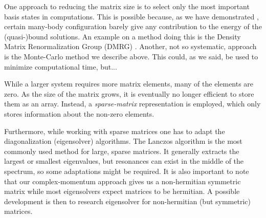 \documentclass[../main/report.tex]{subfiles}
\begin{document}
One approach to reducing the matrix size is to select only the most important basis states in computations.
This is possible because, as we have demonstrated
, certain many-body configuration barely give any contribution to the energy of the (quasi-)bound solutions. 
An example on a method doing this is the Density Matrix Renormalization Group (DMRG) \cite{DMRG}.
Another, not so systematic, approach is the Monte-Carlo method we describe above.
This could, as we said, be used to minimize computational time, but...

While a larger system requires more matrix elements, many of the elements are zero. 
As the size of the matrix grows, it is eventually no longer efficient to store them as an array. 
Instead, a \emph{sparse-matrix} representation is employed, which only stores information about the non-zero elements. 

Furthermore, while working with sparse matrices one has to adapt the diagonalization (eigensolver) algorithms. 
The Lanczos algorithm is the most commonly used method for large, sparse matrices.
It generally extracts the largest or smallest eigenvalues, but resonances can exist in the middle of the spectrum, so some adaptations might be required.
It is also important to note that our complex-momentum approach gives us a non-hermitian symmetric matrix while most eigensolvers expect matrices to be hermitian. A possible development is then to research eigensolver for non-hermitian (but symmetric) matrices.

\end{document}

